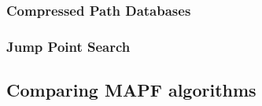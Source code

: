 \documentclass[a4paper,11pt]{article}
\begin{document}
\subsubsection{Compressed Path Databases}

\subsubsection{Jump Point Search}

\cite{renukamurthy2016improving}







\subsection{Comparing MAPF algorithms}
\end{document}
